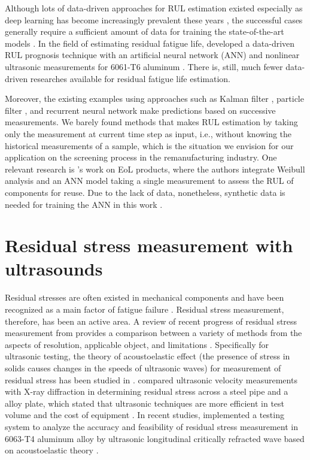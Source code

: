  Although lots of data-driven approaches for RUL estimation existed \cite{rul-review-SI20111, rul-review-LEI2018799} especially as deep learning has become increasingly prevalent these years \cite{rul-review-KHAN2018241}, the successful cases generally require a sufficient amount of data for training the state-of-the-art models \cite{rul-cnn-bearing-LI20181, rul-ensemble-bearing, rul-cnn-turbo-LI20181,rul-rnn-turbo-WU2020241, rul-gpr-battery-9040661}. In the field of estimating residual fatigue life,  developed a data-driven RUL prognosis technique with an artificial neural network (ANN) and nonlinear ultrasonic measurements for 6061-T6 aluminum \cite{rul-nn-fatigue-ultrasound-LIM2018185}. There is, still, much fewer data-driven researches available for residual fatigue life estimation. 

 Moreover, the existing examples using approaches such as Kalman filter \cite{rul-statespace-fatigue-RAY1996}, particle filter \cite{rul-statespace-fatigue-8819426}, and recurrent neural network \cite{rul-rnn-turbo-WU2020241} make predictions based on successive measurements. We barely found methods that makes RUL estimation by taking only the measurement at current time step as input, i.e., without knowing the historical measurements of a sample, which is the situation we envision for our application on the screening process in the remanufacturing industry. One relevant research is 's work on EoL products, where the authors integrate Weibull analysis and an ANN model taking a single measurement to assess the RUL of components for reuse. Due to the lack of data, nonetheless, synthetic data is needed for training the ANN in this work \cite{rul-nn-eol-MAZHAR20071184}.


\section{Residual stress measurement with ultrasounds}
Residual stresses are often existed in mechanical components and have been recognized as a main factor of fatigue failure \cite{rs-fatigue-WEBSTER2001375}. Residual stress measurement, therefore, has been an active area. A review of recent progress of residual stress measurement from  provides a comparison between a variety of methods from the aspects of resolution, applicable object, and limitations \cite{nde-rs-review-GUO202154}. Specifically for ultrasonic testing, the theory of acoustoelastic effect (the presence of stress in solids causes changes in the speeds of ultrasonic waves) for measurement of residual stress has been studied in \cite{nde-lu-rs-Man1987}.  compared ultrasonic velocity measurements with X-ray diffraction in determining residual stress across a steel pipe and a alloy plate, which stated that ultrasonic techniques are more efficient in test volume and the cost of equipment \cite{nde-lu-rs-TANALA199583}. In recent studies,  implemented a testing system to analyze the accuracy and feasibility of residual stress measurement in 6063-T4 aluminum alloy by ultrasonic longitudinal critically refracted wave based on acoustoelastic theory \cite{nde-lu-rs-LIU2018178}.

